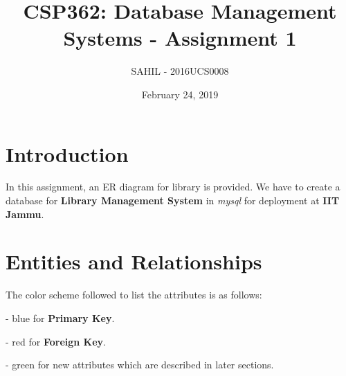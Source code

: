 \documentclass{article}
\title{CSP362: Database Management Systems - Assignment 1}
\author{SAHIL - 2016UCS0008}
\date{February 24, 2019}
\begin{document}
\maketitle

\section{Introduction}
\large
In this assignment, an ER diagram for library is provided. We have to create a database for \textbf{Library Management System} in \textit{mysql} for deployment at \textbf{IIT Jammu}.

\section{Entities and Relationships}
The color scheme followed to list the attributes is as follows:

\item - {\color{blue}blue} for \textbf{Primary Key}.
\item - {\color{red}red} for \textbf{Foreign Key}.
\item - {\color{green}green} for new attributes which are described in later sections. 
\end{document}

